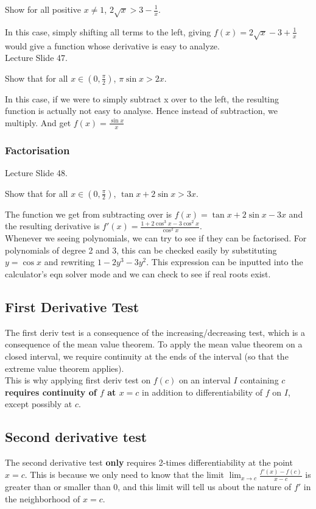 \documentclass{article}
\begin{document}
Show for all positive $x\neq 1$, $2\sqrt{x}>3-\frac{1}{x}$.

In this case, simply shifting all terms to the left, giving $f(x)=2\sqrt{x}-3+\frac{1}{x}$ would give a function whose derivative is easy to analyze.\\

Lecture Slide 47.

Show that for all $x\in(0,\frac{\pi}{2})$, $\pi \sin x>2x$.

In this case, if we were to simply subtract x over to the left, the resulting function is actually not easy to analyse. Hence instead of subtraction, we multiply. And get $f(x)=\frac{\sin x}{x}$

\subsubsection{Factorisation}
Lecture Slide 48.

Show that for all $x\in (0,\frac{\pi}{2})$, $\tan x+2\sin x>3x$.

The function we get from subtracting over is $f(x)=\tan x+2\sin x-3x$ and the resulting derivative is $f'(x)=\frac{1+2\cos^3x-3\cos^2x}{\cos^2x}$.\\
Whenever we seeing polynomials, we can try to see if they can be factorised. For polynomials of degree 2 and 3, this can be checked easily by substituting $y=\cos x$ and rewriting $1-2y^3-3y^2$. This expression can be inputted into the calculator's eqn solver mode and we can check to see if real roots exist.

\subsection{First Derivative Test}
The first deriv test is a consequence of the increasing/decreasing test, which is a consequence of the mean value theorem.
To apply the mean value theorem on a closed interval, we require continuity at the ends of the interval (so that the extreme value theorem applies).\\
This is why applying first deriv test on $f(c)$ on an interval $I$ containing $c$ \textbf{requires continuity of $f$ at $x=c$} in addition to differentiability of $f$ on $I$, except possibly at $c$.

\subsection{Second derivative test}
The second derivative test \textbf{only} requires 2-times differentiability at the point $x=c$. This is because we only need to know that the limit $\lim_{x\rightarrow c}\frac{f'(x)-f(c)}{x-c}$ is greater than or smaller than 0, and this limit will tell us about the nature of $f'$ in the neighborhood of $x=c$. 
\end{document}
